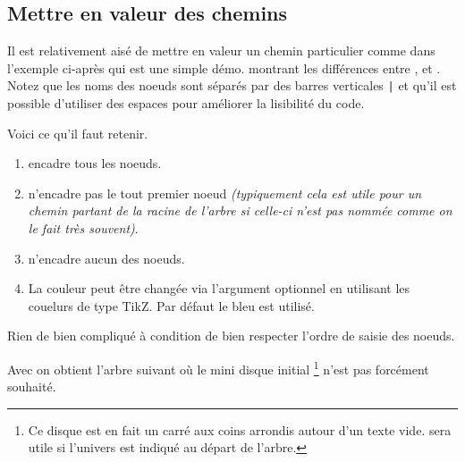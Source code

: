 \documentclass[12pt,a4paper]{article}
\begin{document}






\subsection{Mettre en valeur des chemins}


Il est relativement aisé de mettre en valeur un chemin particulier comme dans l'exemple ci-après qui est une simple démo. montrant les différences entre ,   et .
Notez que les noms des noeuds sont séparés par des barres verticales \verb#|# et  qu'il est possible d'utiliser des espaces pour améliorer la lisibilité du code. 


Voici ce qu'il faut retenir.

\begin{enumerate}
	\item {} encadre tous les noeuds.

	\item {} n'encadre pas le tout premier noeud \emph{(typiquement cela est utile pour un chemin partant de la racine de l'arbre si celle-ci n'est pas nommée comme on le fait très souvent)}.

	\item {} n'encadre aucun des noeuds.
	
	\item La couleur peut être changée via l'argument optionnel en utilisant les couelurs de type TikZ. Par défaut le bleu est utilisé.
\end{enumerate}





Rien de bien compliqué à condition de bien respecter l'ordre de saisie des noeuds.



Avec  on obtient l'arbre suivant où le mini disque initial
\footnote{
	Ce disque est en fait un carré aux coins arrondis autour d'un texte vide.
	 sera utile si l'univers est indiqué au départ de l'arbre.
}
n'est pas forcément souhaité.
\end{document}
